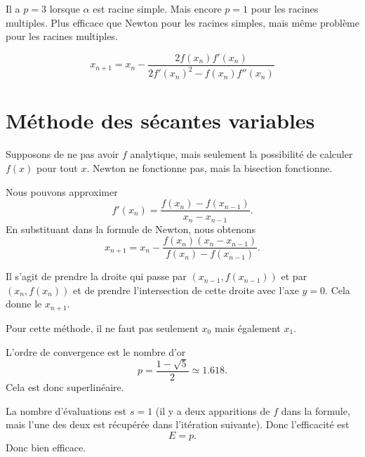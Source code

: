 Il a \( p=3\) lorsque \( \alpha\) est racine simple. Mais encore \( p=1\) pour les racines multiples. Plus efficace que Newton pour les racines simples, mais même problème pour les racines multiples.

\begin{equation}
    x_{n+1}=x_n-\frac{ 2f(x_n)f'(x_n) }{ 2f'(x_n)^2-f(x_n)f''(x_n) }
\end{equation}

\section{Méthode des sécantes variables}
\label{SECooIUEUooVcHAoc}

Supposons de ne pas avoir \( f\) analytique, mais seulement la possibilité de calculer \( f(x)\) pour tout \( x\). Newton ne fonctionne pas, mais la bisection fonctionne.

Nous pouvons approximer
\begin{equation}
    f'(x_n)=\frac{ f(x_n)-f(x_{n-1}) }{ x_n-x_{n-1} }.
\end{equation}
En substituant dans la formule de Newton, nous obtenons
\begin{equation}
    x_{n+1}=x_n-\frac{ f(x_n)(x_n-x_{n-1}) }{ f(x_n)-f(x_{n-1}) }.
\end{equation}

Il s'agit de prendre la droite qui passe par \( (x_{n-1},f(x_{n-1}))\) et par \( (x_n,f(x_n))\) et de prendre l'intersection de cette droite avec l'axe \( y=0\). Cela donne le \( x_{n+1}\).

Pour cette méthode, il ne faut pas seulement \( x_0\) mais également \( x_1\).

L'ordre de convergence est le nombre d'or
\begin{equation}    \label{EQooQEFCooUsGVjP}
    p=\frac{ 1-\sqrt{ 5 } }{ 2 }\simeq 1.618.
\end{equation}
Cela est donc superlinéaire.

La nombre d'évaluations est \( s=1\) (il y a deux apparitions de \( f\) dans la formule, mais l'une des deux est récupérée dans l'itération suivante). Donc l'efficacité est
\begin{equation}
    E=p.
\end{equation}
Donc bien efficace.


